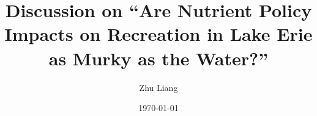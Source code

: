\documentclass[professionalfonts, aspectratio=169]{beamer}
\title{Discussion on ``Are Nutrient Policy Impacts on Recreation in Lake Erie as Murky as the Water?''}
\institute{Stony Brook University}
\author{Zhu Liang}
\date{\today}
\begin{document}
\begin{frame}
    \titlepage
\end{frame}
\end{document}
